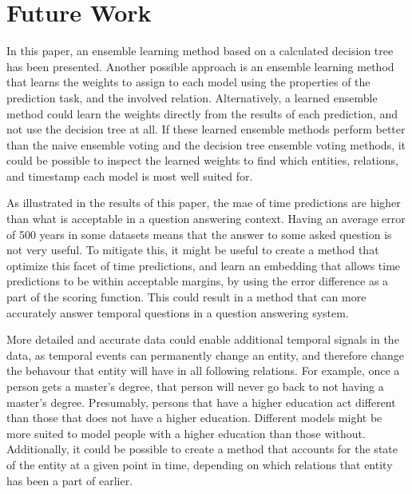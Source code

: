 \section{Future Work}
\label{sec:future-work}

In this paper, an ensemble learning method based on a calculated decision tree has been presented. Another possible approach is an ensemble learning method that learns the weights to assign to each model using the properties of the prediction task, and the involved relation. Alternatively, a learned ensemble method could learn the weights directly from the results of each prediction, and not use the decision tree at all. If these learned ensemble methods perform better than the naive ensemble voting and the decision tree ensemble voting methods, it could be possible to inspect the learned weights to find which entities, relations, and timestamp each model is most well suited for.

As illustrated in the results of this paper, the \gls{mae} of time predictions are higher than what is acceptable in a question answering context. Having an average error of 500 years in some datasets means that the answer to some asked question is not very useful. To mitigate this, it might be useful to create a method that optimize this facet of time predictions, and learn an embedding that allows time predictions to be within acceptable margins, by using the error difference as a part of the scoring function. This could result in a method that can more accurately answer temporal questions in a question answering system.

More detailed and accurate data could enable additional temporal signals in the data, as temporal events can permanently change an entity, and therefore change the behavour that entity will have in all following relations. For example, once a person gets a master's degree, that person will never go back to not having a master's degree. Presumably, persons that have a higher education act different than those that does not have a higher education. Different models might be more suited to model people with a higher education than those without. Additionally, it could be possible to create a method that accounts for the state of the entity at a given point in time, depending on which relations that entity has been a part of earlier.

